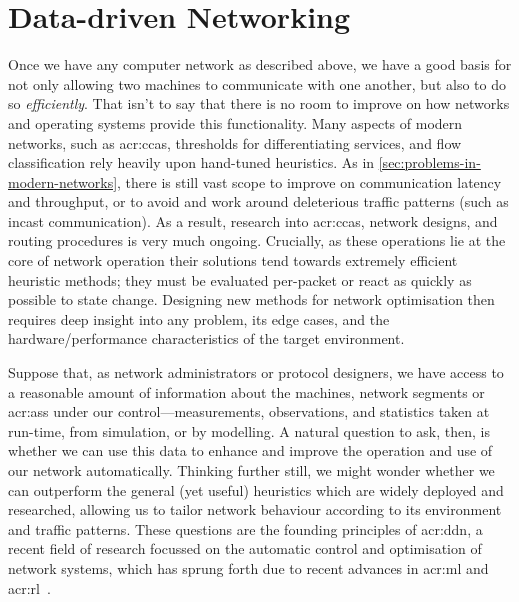 \chapter{Data-driven Networking}
Once we have any computer network as described above, we have a good basis for not only allowing two machines to communicate with one another, but also to do so \emph{efficiently}.
That isn't to say that there is no room to improve on how networks and operating systems provide this functionality.
Many aspects of modern networks, such as \glspl{acr:cca}, thresholds for differentiating services, and flow classification rely heavily upon hand-tuned heuristics.
As in \cref{sec:problems-in-modern-networks}, there is still vast scope to improve on communication latency and throughput, or to avoid and work around deleterious traffic patterns (such as incast communication).
As a result, research into \glspl{acr:cca}, network designs, and routing procedures is very much ongoing.
Crucially, as these operations lie at the core of network operation their solutions tend towards extremely efficient heuristic methods; they must be evaluated per-packet or react as quickly as possible to state change.
Designing new methods for network optimisation then requires deep insight into any problem, its edge cases, and the hardware/performance characteristics of the target environment.

Suppose that, as network administrators or protocol designers, we have access to a reasonable amount of information about the machines, network segments or \glspl{acr:as} under our control---measurements, observations, and statistics taken at run-time, from simulation, or by modelling.
A natural question to ask, then, is whether we can use this data to enhance and improve the operation and use of our network automatically.
Thinking further still, we might wonder whether we can outperform the general (yet useful) heuristics which are widely deployed and researched, allowing us to tailor network behaviour according to its environment and traffic patterns.
These questions are the founding principles of \gls{acr:ddn}, a recent field of research focussed on the automatic control and optimisation of network systems, which has sprung forth due to recent advances in \gls{acr:ml} and \gls{acr:rl}~\parencite{DBLP:conf/anrw/FeamsterR18,DBLP:journals/pieee/KellererKBBR019}.

